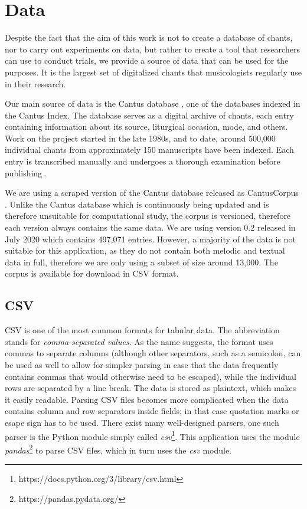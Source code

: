 \chapter{Data}

Despite the fact that the aim of this work is not to create a database of chants, nor to carry out experiments on data, but rather to create a tool
that researchers can use to conduct trials, we provide a source of data that can be used for the purposes. It is the largest set of digitalized
chants that musicologists regularly use in their research.

Our main source of data is the Cantus database \citep{cantus_db}, one of the databases indexed in the Cantus Index. The database serves as a 
digital archive of chants, each entry containing information about its source, liturgical occasion, mode, and others. Work on the project started
in the late 1980s, and to date, around 500,000 individual chants from approximately 150 manuscripts have been indexed. Each entry is transcribed 
manually and undergoes a thorough examination before publishing \citep{cantus_lacoste}.

We are using a scraped version of the Cantus database released as CantusCorpus \citep{chant21}. Unlike the Cantus database which is continuously being
updated and is therefore unsuitable for computational study, the corpus is versioned, therefore each version always contains the same data. We are using
version 0.2 released in July 2020 which contains 497,071 entries. However, a majority of the data is not suitable for this application, as they do not
contain both melodic and textual data in full, therefore we are only using a subset of size around 13,000. The corpus is available for download in CSV format.

\section{CSV}

CSV is one of the most common formats for tabular data. The abbreviation stands for \emph{comma-separated values}. As the name suggests, the format
uses commas to separate columns (although other separators, such as a semicolon, can be used as well to allow for simpler parsing in case that the data 
frequently contains commas that would otherwise need to be escaped), while the individual rows are separated by a line break. The data is stored as plaintext,
which makes it easily readable. Parsing CSV files becomes more complicated when the data contains column and row separators inside fields; in that case
quotation marks or esape sign has to be used. There exist many well-designed parsers, one such parser is the Python module simply called \emph{csv}\footnote{https://docs.python.org/3/library/csv.html}.
This application uses the module \emph{pandas}\footnote{https://pandas.pydata.org/} to parse CSV files, which in turn uses the \emph{csv} module.

